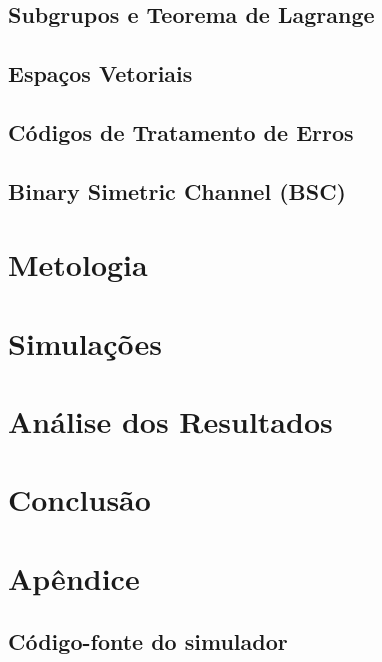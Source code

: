 \documentclass[]{article}
\begin{document}
\subsection{Subgrupos e Teorema de Lagrange}
\subsection{Espaços Vetoriais}
\subsection{Códigos de Tratamento de Erros}
\subsection{Binary Simetric Channel (BSC)}

\section{Metologia}
\section{Simulações}

\section{Análise dos Resultados}

\section{Conclusão}

\appendix
\section{Apêndice}
\subsection{Código-fonte do simulador}
\end{document}
